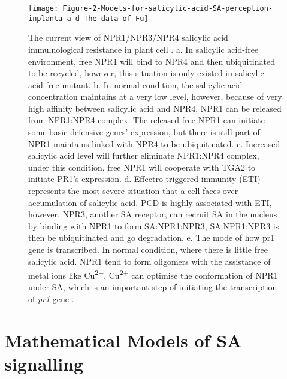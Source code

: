 \begin{figure}
	\centering
	\texttt{[image: Figure-2-Models-for-salicylic-acid-SA-perception-inplanta-a-d-The-data-of-Fu]}
	\caption{The current view of NPR1/NPR3/NPR4 salicylic acid immulnological resistance in plant cell \citep{liu2015salicylic}. a. In salicylic acid-free environment, free NPR1 will bind to NPR4 and then ubiquitinated to be recycled, however, this situation is only existed in salicylic acid-free mutant. b. In normal condition, the salicylic acid concentration maintains at a very low level, however, because of very high affinity between salicylic acid and NPR4, NPR1 can be released from NPR1:NPR4 complex. The released free NPR1 can initiate some basic defensive genes' expression, but there is still part of NPR1 maintains linked with NPR4 to be ubiquitinated. c. Increased salicylic acid level will further eliminate NPR1:NPR4 complex, under this condition, free NPR1 will cooperate with TGA2 to initiate PR1's expression. d. Effectro-triggered immunity (ETI) represents the most severe situation that a cell faces over-accumulation of salicylic acid. PCD is highly associated with ETI, however, NPR3, another SA receptor, can recruit SA in the nucleus by binding with NPR1 to form SA:NPR1:NPR3, SA:NPR1:NPR3 is then be ubiquitinated and go degradation. e. The mode of how pr1 gene is transcribed. In normal condition, where there is little free salicylic acid. NPR1 tend to form oligomers with the assistance of metal ions like Cu\textsuperscript{2+}, Cu\textsuperscript{2+} can optimise the conformation of NPR1 under SA, which is an important step of initiating the transcription of \textit{pr1} gene \citep{wu2012arabidopsis}.}
	\label{fig:NPR1_mode}
\end{figure}
\linebreak
\section{Mathematical Models of SA signalling}
